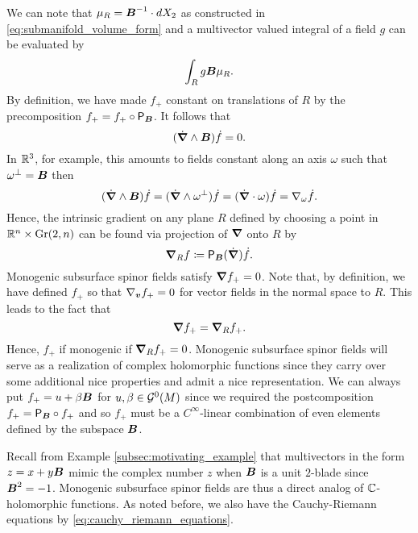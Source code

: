 We can note that $\mu_R = \boldsymbol{B}^{-1} \cdot dX_2$ as constructed in \cref{eq:submanifold_volume_form} and a multivector valued integral of a field $g$ can be evaluated by
\begin{equation}
\int_R g\boldsymbol{B}\mu_R.
\end{equation}
By definition, we have made $f_+$ constant on translations of $R$ by the precomposition $f_+ = f_+ \circ \mathsf{P}_{\boldsymbol{B}}$. It follows that 
\begin{equation}
\label{eq:exterior_b_derivative}
(\dot{\boldsymbol{\nabla}} \wedge \boldsymbol{B})\dot{f} = 0.
\end{equation}
In $\mathbb{R}^3$, for example, this amounts to fields constant along an axis $\omega$ such that $\omega^\perp = \boldsymbol{B}$ then
\begin{equation}
\label{eq:omega_axial_equivalence}
(\dot{\boldsymbol{\nabla}} \wedge \boldsymbol{B})\dot{f} = (\dot{\boldsymbol{\nabla}} \wedge \omega^\perp)\dot{f}  =(\dot{\boldsymbol{\nabla}} \cdot \omega)\dot{f} = \nabla_\omega \dot{f}.
\end{equation} 
Hence, the intrinsic gradient on any plane $R$ defined by choosing a point in $\mathbb{R}^n \times \operatorname{Gr}(2,n)$ can be found via projection of $\boldsymbol{\nabla}$ onto $R$ by 
\begin{equation}
\boldsymbol{\nabla}_R f \coloneqq \mathsf{P}_{\boldsymbol{B}} (\dot{\boldsymbol{\nabla}})\dot{f}.
\end{equation} 
Monogenic subsurface spinor fields satisfy $\boldsymbol{\nabla} f_+ = 0$. Note that, by definition, we have defined $f_+$ so that $\nabla_{\boldsymbol{v}} f_+ =0$ for vector fields in the normal space to $R$. This leads to the fact that
\begin{equation}
\boldsymbol{\nabla} f_+ = \boldsymbol{\nabla}_R f_+.
\end{equation}
Hence, $f_+$ if monogenic if $\boldsymbol{\nabla}_R f_+ =0$.  Monogenic subsurface spinor fields will serve as a realization of complex holomorphic functions since they carry over some additional nice properties and admit a nice representation. We can always put $f_+=u+\beta \boldsymbol{B}$ for $u,\beta \in \mathcal{G}^0(M)$ since we required the postcomposition $f_+=\mathsf{P}_{\boldsymbol{B}} \circ f_+$ and so $f_+$ must be a $C^\infty$-linear combination of even elements defined by the subspace $\boldsymbol{B}$.  

Recall from Example \ref{subsec:motivating_example} that multivectors in the form $z=x+y\boldsymbol{B}$ mimic the complex number $z$ when $\boldsymbol{B}$ is a unit $2$-blade since $\boldsymbol{B}^2=-1$.  Monogenic subsurface spinor fields are thus a direct analog of $\mathbb{C}$-holomorphic functions.  As noted before, we also have the Cauchy-Riemann equations by \cref{eq:cauchy_riemann_equations}.

